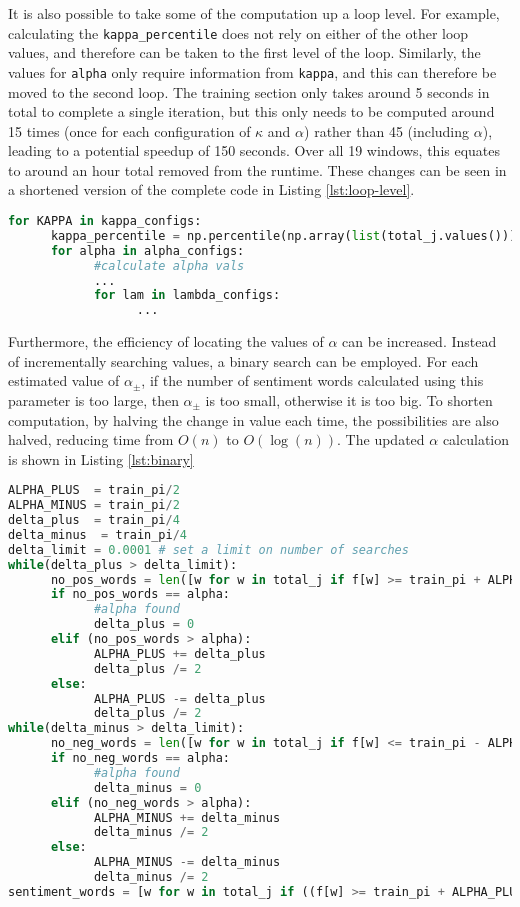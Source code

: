 \documentclass[ oneside,%
                    author={Joshua Felmeden},
                    degree={MEng},
                     title={Sentiment Analysis of Financial Headlines Based on Realised Stock Returns},
                  subtitle={Research}]{dissertation}
\begin{document}
It is also possible to take some of the computation up a loop level. For example, calculating the \texttt{kappa\_percentile} does not rely on either of the other loop values, and therefore can be taken to the first level of the loop. Similarly, the values for \texttt{alpha} only require information from \texttt{kappa}, and this can therefore be moved to the second loop. The training section only takes around 5 seconds in total to complete a single iteration, but this only needs to be computed around 15 times (once for each configuration of $\kappa$ and $\alpha$) rather than 45 (including $\alpha$), leading to a potential speedup of 150 seconds. Over all 19 windows, this equates to around an hour total removed from the runtime. These changes can be seen in a shortened version of the complete code in Listing \ref{lst:loop-level}.

\begin{lstlisting}[float={!htb},caption={Moving computation up loop levels},label={lst:loop-level},language=Python]
for KAPPA in kappa_configs:
      kappa_percentile = np.percentile(np.array(list(total_j.values())),KAPPA) # return the nth percentile of all appearances for KAPPA
      for alpha in alpha_configs:
            #calculate alpha vals
            ...
            for lam in lambda_configs:
                  ...
\end{lstlisting}

Furthermore, the efficiency of locating the values of $\alpha$ can be increased. Instead of incrementally searching values, a binary search can be employed. For each estimated value of $\alpha_\pm$, if the number of sentiment words calculated using this parameter is too large, then $\alpha_\pm$ is too small, otherwise it is too big. To shorten computation, by halving the change in value each time, the possibilities are also halved, reducing time from $O(n)$ to $O(\log(n))$. The updated $\alpha$ calculation is shown in Listing \ref{lst:binary}
\begin{lstlisting}[float={!htb},caption={Binary search for alpha values},label={lst:binary},language=Python]
ALPHA_PLUS  = train_pi/2
ALPHA_MINUS = train_pi/2
delta_plus  = train_pi/4
delta_minus  = train_pi/4
delta_limit = 0.0001 # set a limit on number of searches
while(delta_plus > delta_limit):
      no_pos_words = len([w for w in total_j if f[w] >= train_pi + ALPHA_PLUS and total_j[w] >= kappa_percentile])
      if no_pos_words == alpha:
            #alpha found
            delta_plus = 0
      elif (no_pos_words > alpha):
            ALPHA_PLUS += delta_plus
            delta_plus /= 2
      else:
            ALPHA_PLUS -= delta_plus
            delta_plus /= 2
while(delta_minus > delta_limit):
      no_neg_words = len([w for w in total_j if f[w] <= train_pi - ALPHA_MINUS and total_j[w] >= kappa_percentile])
      if no_neg_words == alpha:
            #alpha found
            delta_minus = 0
      elif (no_neg_words > alpha):
            ALPHA_MINUS += delta_minus
            delta_minus /= 2
      else:
            ALPHA_MINUS -= delta_minus
            delta_minus /= 2
sentiment_words = [w for w in total_j if ((f[w] >= train_pi + ALPHA_PLUS or f[w] <= train_pi - ALPHA_MINUS) and total_j[w] >= kappa_percentile)]
\end{lstlisting}
\end{document}
